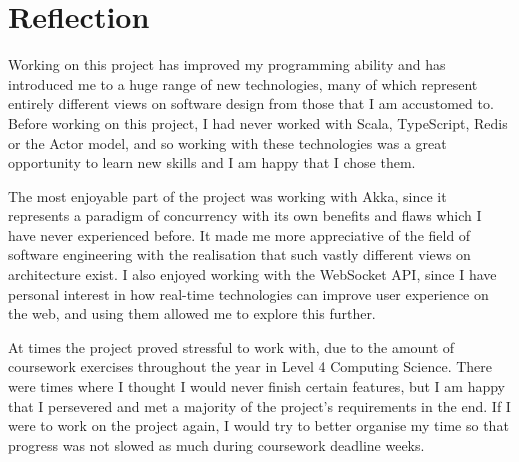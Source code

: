 \documentclass{l4proj}
\begin{document}
    \section{Reflection}
    Working on this project has improved my programming ability and has introduced me to a huge range of new technologies, many of which represent entirely different views on software design from those that I am accustomed to. Before working on this project, I had never worked with Scala, TypeScript, Redis or the Actor model, and so working with these technologies was a great opportunity to learn new skills and I am happy that I chose them.
    
    The most enjoyable part of the project was working with Akka, since it represents a paradigm of concurrency with its own benefits and flaws which I have never experienced before. It made me more appreciative of the field of software engineering with the realisation that such vastly different views on architecture exist. I also enjoyed working with the WebSocket API, since I have personal interest in how real-time technologies can improve user experience on the web, and using them allowed me to explore this further.
    
    At times the project proved stressful to work with, due to the amount of coursework exercises throughout the year in Level 4 Computing Science. There were times where I thought I would never finish certain features, but I am happy that I persevered and met a majority of the project's requirements in the end. If I were to work on the project again, I would try to better organise my time so that progress was not slowed as much during coursework deadline weeks.
\end{document}
